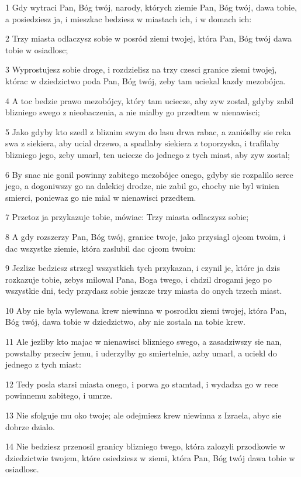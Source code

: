 \par 1 Gdy wytraci Pan, Bóg twój, narody, których ziemie Pan, Bóg twój, dawa tobie, a posiedziesz ja, i mieszkac bedziesz w miastach ich, i w domach ich:
\par 2 Trzy miasta odlaczysz sobie w posród ziemi twojej, która Pan, Bóg twój dawa tobie w osiadlosc;
\par 3 Wyprostujesz sobie droge, i rozdzielisz na trzy czesci granice ziemi twojej, którac w dziedzictwo poda Pan, Bóg twój, zeby tam uciekal kazdy mezobójca.
\par 4 A toc bedzie prawo mezobójcy, który tam uciecze, aby zyw zostal, gdyby zabil blizniego swego z nieobaczenia, a nie mialby go przedtem w nienawisci;
\par 5 Jako gdyby kto szedl z bliznim swym do lasu drwa rabac, a zanióslby sie reka swa z siekiera, aby ucial drzewo, a spadlaby siekiera z toporzyska, i trafilaby blizniego jego, zeby umarl, ten uciecze do jednego z tych miast, aby zyw zostal;
\par 6 By snac nie gonil powinny zabitego mezobójce onego, gdyby sie rozpalilo serce jego, a dogoniwszy go na dalekiej drodze, nie zabil go, chocby nie byl winien smierci, poniewaz go nie mial w nienawisci przedtem.
\par 7 Przetoz ja przykazuje tobie, mówiac: Trzy miasta odlaczysz sobie;
\par 8 A gdy rozszerzy Pan, Bóg twój, granice twoje, jako przysiagl ojcom twoim, i dac wszystke ziemie, która zaslubil dac ojcom twoim:
\par 9 Jezlize bedziesz strzegl wszystkich tych przykazan, i czynil je, które ja dzis rozkazuje tobie, zebys milowal Pana, Boga twego, i chdzil drogami jego po wszystkie dni, tedy przydasz sobie jeszcze trzy miasta do onych trzech miast.
\par 10 Aby nie byla wylewana krew niewinna w posrodku ziemi twojej, która Pan, Bóg twój, dawa tobie w dziedzictwo, aby nie zostala na tobie krew.
\par 11 Ale jezliby kto majac w nienawisci blizniego swego, a zasadziwszy sie nan, powstalby przeciw jemu, i uderzylby go smiertelnie, azby umarl, a uciekl do jednego z tych miast:
\par 12 Tedy posla starsi miasta onego, i porwa go stamtad, i wydadza go w rece powinnemu zabitego, i umrze.
\par 13 Nie sfolguje mu oko twoje; ale odejmiesz krew niewinna z Izraela, abyc sie dobrze dzialo.
\par 14 Nie bedziesz przenosil granicy blizniego twego, która zalozyli przodkowie w dziedzictwie twojem, które osiedziesz w ziemi, która Pan, Bóg twój dawa tobie w osiadlosc.
